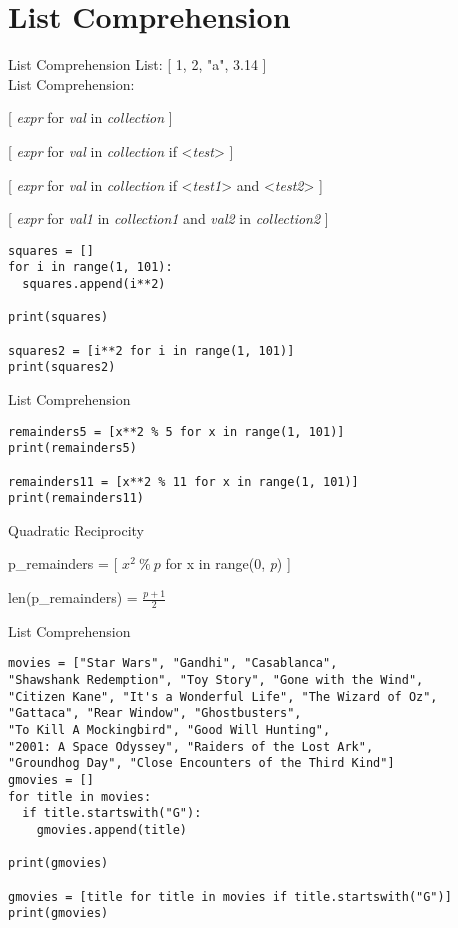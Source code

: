 \documentclass{beamer}
\begin{document}
\section{List Comprehension}

\begin{frame}[fragile]{List Comprehension}
List: [ 1, 2, "a", 3.14 ] \\
List Comprehension: \par
\hspace{3cm}[ \textit{expr} for \textit{val} in \textit{collection} ] \par
\hspace{3cm}[ \textit{expr} for \textit{val} in \textit{collection}
  if <\textit{test}> ] \par
  \hspace{3cm}[ \textit{expr} for \textit{val} in \textit{collection}
  if <\textit{test1}> and <\textit{test2}> ] \par
  \hspace{3cm}[ \textit{expr} for \textit{val1} in 
  \textit{collection1} and \textit{val2} in \textit{collection2} ]
\begin{verbatim}
squares = []
for i in range(1, 101):
  squares.append(i**2)

print(squares)

squares2 = [i**2 for i in range(1, 101)]
print(squares2)
\end{verbatim}
\end{frame}

\begin{frame}[fragile]{List Comprehension}
\begin{verbatim}
remainders5 = [x**2 % 5 for x in range(1, 101)]
print(remainders5)

remainders11 = [x**2 % 11 for x in range(1, 101)]
print(remainders11)
\end{verbatim}
\begin{center}
\large{Quadratic Reciprocity}
\end{center}
p\_remainders = [ $x^2\ \%\ p$ for x in range(0, \textit{p}) ]
\par \vspace{1em}
len(p\_remainders) = $\frac{p+1}{2}$
\end{frame}

\begin{frame}[fragile]{List Comprehension}
\begin{verbatim}
movies = ["Star Wars", "Gandhi", "Casablanca", 
"Shawshank Redemption", "Toy Story", "Gone with the Wind", 
"Citizen Kane", "It's a Wonderful Life", "The Wizard of Oz", 
"Gattaca", "Rear Window", "Ghostbusters", 
"To Kill A Mockingbird", "Good Will Hunting", 
"2001: A Space Odyssey", "Raiders of the Lost Ark", 
"Groundhog Day", "Close Encounters of the Third Kind"]
gmovies = []
for title in movies:
  if title.startswith("G"):
    gmovies.append(title)

print(gmovies)

gmovies = [title for title in movies if title.startswith("G")]
print(gmovies)
\end{verbatim}
\end{frame}
\end{document}
